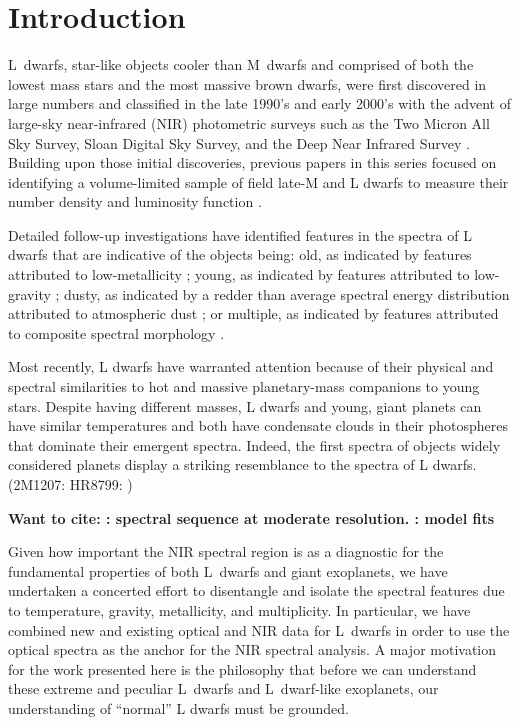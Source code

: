 \documentclass[12pt,preprint]{aastex}
\begin{document}
\section{Introduction}
L~dwarfs, star-like objects cooler than M~dwarfs and comprised of both the lowest mass stars and the most massive brown dwarfs, were first discovered in large numbers and classified in the late 1990's and early 2000's with the advent of large-sky near-infrared (NIR) photometric surveys such as the Two Micron All Sky Survey, Sloan Digital Sky Survey, and the Deep Near Infrared Survey \citep{K99,Martin99,K00,Hawley02,Kendall04,Knapp04}. 
Building upon those initial discoveries, previous papers in this series focused on identifying a volume-limited sample of field late-M and L dwarfs to measure their number density and luminosity function \citep[Papers V, IX, and X]{Cruz03,Cruz07,Reid08}.

Detailed follow-up investigations have identified features in the spectra of L dwarfs that are indicative of the objects being: old, as indicated by features attributed to low-metallicity \citep{Burgasser08_blue}; young, as indicated by features attributed to low-gravity \citep{Kirkpatrick08,Cruz09_lowg}; dusty, as indicated by a redder than average spectral energy distribution attributed to atmospheric dust \citep{Looper08_dusty,Geissler2011,Gizis12_0047}; or multiple, as indicated by features attributed to composite spectral morphology \citep{Cruz04,Burgasser07_0805,Geissler2011,Burgasser08_0320}.

Most recently, L dwarfs have warranted attention because of their physical and spectral similarities to hot and massive planetary-mass companions to young stars. 
Despite having different masses, L dwarfs and young, giant planets can have similar temperatures and both have condensate clouds in their photospheres that dominate their emergent spectra.
Indeed, the first spectra of objects widely considered planets display a striking resemblance to the spectra of L dwarfs. (2M1207: \citet{Patience10}
HR8799: \citet{Barman:2011wp,Bowler10_HR8799,Konopacky:2013jv,Oppenheimer:2013gy})

\textbf{Want to cite: \citet{Cushing05}: spectral sequence at moderate resolution. \citet{Cushing08, Witte11}: model fits
}

Given how important the NIR spectral region is as a diagnostic for the fundamental properties of both L~dwarfs and giant exoplanets, we have undertaken a concerted effort to disentangle and isolate the spectral features due to temperature, gravity, metallicity, and multiplicity. In particular, we have combined new and existing optical and NIR data for L~dwarfs in order to use the optical spectra as the anchor for the NIR spectral analysis. 
A major motivation for the work presented here is the philosophy that before we can understand these extreme and peculiar L~dwarfs and L~dwarf-like exoplanets, our understanding of ``normal'' L dwarfs must be grounded. 
\end{document}

